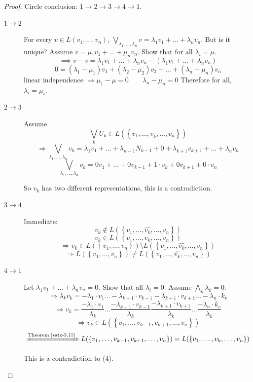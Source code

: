 \documentclass[a4paper,landscape,twocolumn]{article}
\newcommand\set[1]{\left\{#1\right\}}
\begin{document}
\begin{proof}
  Circle conclusion: $1 \rightarrow 2 \rightarrow 3 \rightarrow 4 \rightarrow 1$.

  \begin{description}
    \item[$1 \rightarrow 2$]
      For every $v \in L(v_1, \ldots, v_n)$, $\bigvee_{\lambda_1, \ldots, \lambda_n} v = \lambda_1 v_1 + \ldots + \lambda_n v_n$.
      But is it unique? Assume $v = \mu_1 v_1 + \ldots + \mu_n v_n$.
      Show that for all $\lambda_i = \mu$.
      \[ \implies v - v = \lambda_1 v_1  + \ldots + \lambda_n v_n - (\lambda_1 v_1 + \ldots + \lambda_n v_n) \]
      \[ 0 = (\lambda_1 - \mu_1) v_1 + (\lambda_2 - \mu_2) v_2 + \ldots + (\lambda_n - \mu_n) v_n \]
      linear independence $\Rightarrow \mu_1 - \mu = 0  \qquad \lambda_n - \mu_n = 0$
      Therefore for all, $\lambda_i = \mu_i$.

    \item[$2 \rightarrow 3$]
      Assume \[ \bigvee_k U_k \in L(\set{v_1, \ldots, v_{\hat{k}}, \ldots, v_n}) \]
      \[ \Rightarrow \bigvee_{\lambda_1, \ldots, \lambda_n} v_k = \lambda_1 v_1 + \ldots + \lambda_{n-1} N_{k-1} + 0 + \lambda_{k+1} v_{k+1} + \ldots + \lambda_n v_n \]
      \[ \bigvee_{\lambda_1, \ldots, \lambda_n} v_k = 0 v_1 + \ldots + 0 v_{k-1} + 1 \cdot v_k + 0 v_{k+1} + 0 \cdot v_n \]

      So $v_k$ has two different representations, this is a contradiction.

    \item[$3 \rightarrow 4$]
      Immediate:
      \[ v_k \not\in L(\set{v_1, \ldots, \hat{v_k}, \ldots, v_n}) \]
      \[ v_k \in L({\set{v_1, \ldots, v_k, \ldots, v_n}}) \]
      \[ \Rightarrow v_k \in L(\set{v_1, \ldots, v_n}) \setminus L(\set{v_1, \ldots, \hat{v_k}, \ldots, v_n}) \]
      \[ \Rightarrow L(\set{v_1, \ldots, v_n}) \neq L(\set{v_1, \ldots, \hat{v_k}, \ldots, v_n}) \]

    \item[$4 \rightarrow 1$]
      Let $\lambda_1 v_1 + \ldots + \lambda_n v_n = 0$.
      Show that all $\lambda_i = 0$.
      Assume $\bigwedge_{k} \lambda_k = 0$.
      \[
        \Rightarrow \lambda_k v_k =
          -\lambda_1 \cdot v_1
          \ldots
          -\lambda_{k-1} \cdot v_{k-1}
          -\lambda_{k+1} \cdot v_{k+1}
          \ldots
          -\lambda_{n} \cdot k_v
      \]
      \[
        \Rightarrow v_k =
          \frac{-\lambda_1 \cdot v_1}{\lambda_k}
          \ldots
          \frac{-\lambda_{k-1} \cdot v_{k-1}}{\lambda_k}
          \frac{-\lambda_{k+1} \cdot v_{k+1}}{\lambda_k}
          \ldots
          \frac{-\lambda_{n} \cdot k_v}{\lambda_k}
      \]
      \[ \Rightarrow v_k \in L(\set{v_1, \ldots, v_{k-1}, v_{k+1}, \ldots, v_n}) \]
      \[ \xRightarrow{\text{Theorem~\ref{satz-3.15}}} L(\set{v_1, \ldots, v_{k-1}, v_{k+1}, \ldots, v_n}) = L(\set{v_1, \ldots, v_k, \ldots, v_n}) \]

      This is a contradiction to (4).
  \end{description}
\end{proof}
\end{document}
